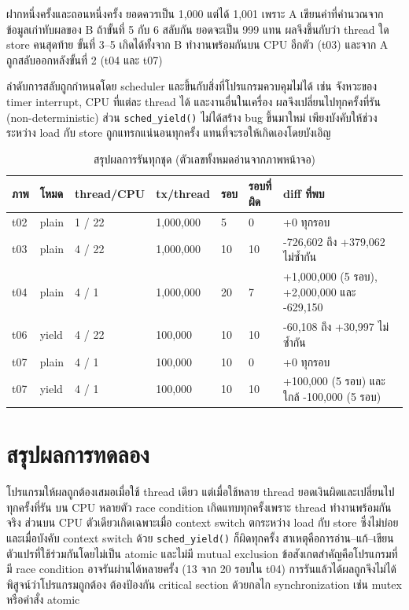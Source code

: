 \documentclass[a4paper,11pt]{article}
\newcommand{\code}[1]{\texttt{#1}}
\begin{document}
ฝากหนึ่งครั้งและถอนหนึ่งครั้ง ยอดควรเป็น 1,000 แต่ได้ 1,001 เพราะ A เขียนค่าที่คำนวณจากข้อมูลเก่าทับผลของ B ถ้าขั้นที่ 5 กับ 6 สลับกัน ยอดจะเป็น 999 แทน ผลจึงขึ้นกับว่า thread ใด store คนสุดท้าย ขั้นที่ 3--5 เกิดได้ทั้งจาก B ทำงานพร้อมกันบน CPU อีกตัว (t03) และจาก A ถูกสลับออกหลังขั้นที่ 2 (t04 และ t07)

ลำดับการสลับถูกกำหนดโดย scheduler และขึ้นกับสิ่งที่โปรแกรมควบคุมไม่ได้ เช่น จังหวะของ timer interrupt, CPU ที่แต่ละ thread ได้ และงานอื่นในเครื่อง ผลจึงเปลี่ยนไปทุกครั้งที่รัน (non-deterministic) ส่วน \code{sched\_yield()} ไม่ได้สร้าง bug ขึ้นมาใหม่ เพียงบังคับให้ช่วงระหว่าง load กับ store ถูกแทรกแน่นอนทุกครั้ง แทนที่จะรอให้เกิดเองโดยบังเอิญ

\begin{table}[H]
\centering\small
\caption{สรุปผลการรันทุกชุด (ตัวเลขทั้งหมดอ่านจากภาพหน้าจอ)}
\begin{tabular}{@{}p{1.0cm}p{1.1cm}p{2.3cm}p{1.9cm}p{0.9cm}p{1.5cm}p{4.9cm}@{}}
\toprule
\textbf{ภาพ} & \textbf{โหมด} & \textbf{thread/CPU} & \textbf{tx/thread} & \textbf{รอบ} & \textbf{รอบที่ผิด} & \textbf{diff ที่พบ} \\
\midrule
t02 & plain & 1 / 22 & 1,000,000 & 5 & 0 & +0 ทุกรอบ \\
t03 & plain & 4 / 22 & 1,000,000 & 10 & 10 & \mbox{-726,602} ถึง +379,062 ไม่ซ้ำกัน \\
t04 & plain & 4 / 1 & 1,000,000 & 20 & 7 & +1,000,000 (5 รอบ), +2,000,000 และ \mbox{-629,150} \\
t06 & yield & 4 / 22 & 100,000 & 10 & 10 & \mbox{-60,108} ถึง +30,997 ไม่ซ้ำกัน \\
t07 & plain & 4 / 1 & 100,000 & 10 & 0 & +0 ทุกรอบ \\
t07 & yield & 4 / 1 & 100,000 & 10 & 10 & +100,000 (5 รอบ) และใกล้ \mbox{-100,000} (5 รอบ) \\
\bottomrule
\end{tabular}
\end{table}

\section*{สรุปผลการทดลอง}

โปรแกรมให้ผลถูกต้องเสมอเมื่อใช้ thread เดียว แต่เมื่อใช้หลาย thread ยอดเงินผิดและเปลี่ยนไปทุกครั้งที่รัน บน CPU หลายตัว race condition เกิดแทบทุกครั้งเพราะ thread ทำงานพร้อมกันจริง ส่วนบน CPU ตัวเดียวเกิดเฉพาะเมื่อ context switch ตกระหว่าง load กับ store ซึ่งไม่บ่อย และเมื่อบังคับ context switch ด้วย \code{sched\_yield()} ก็ผิดทุกครั้ง สาเหตุคือการอ่าน--แก้--เขียนตัวแปรที่ใช้ร่วมกันโดยไม่เป็น atomic และไม่มี mutual exclusion ข้อสังเกตสำคัญคือโปรแกรมที่มี race condition อาจรันผ่านได้หลายครั้ง (13 จาก 20 รอบใน t04) การรันแล้วได้ผลถูกจึงไม่ได้พิสูจน์ว่าโปรแกรมถูกต้อง ต้องป้องกัน critical section ด้วยกลไก synchronization เช่น mutex หรือคำสั่ง atomic
\end{document}
